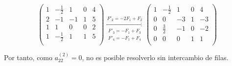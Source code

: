 \begin{ejercicio}
\begin{enumerate}
        \begin{equation*}
        \left(\begin{array}{cccc|c}
            1 & -\frac{1}{2} & 1 & 0 & 4\\
            2 & -1 & -1 & 1 & 5\\
            1 & 1 & 0 & 0 & 2\\
            1 & -\frac{1}{2} & 1 & 1 & 5\\
        \end{array}
        \right) \xrightarrow[\begin{array}{c}	
             \scriptstyle F'_3=-F_1 + F_3 \\
             \scriptstyle F'_4=-F_1 + F_4 
        \end{array}]{F'_2=-2F_1 + F_2}
        \left(\begin{array}{cccc|c}
            1 & -\frac{1}{2} & 1 & 0 & 4\\
            0 & 0 & -3 & 1 & -3\\
            0 & \frac{3}{2} & -1 & 0 & -2\\
            0 & 0 & 0 & 1 & 1\\
        \end{array}
        \right)
        \end{equation*}

        Por tanto, como $a_{22}^{(2)} = 0$, no es posible resolverlo sin intercambio de filas.
        
    \end{enumerate}
\end{ejercicio}

